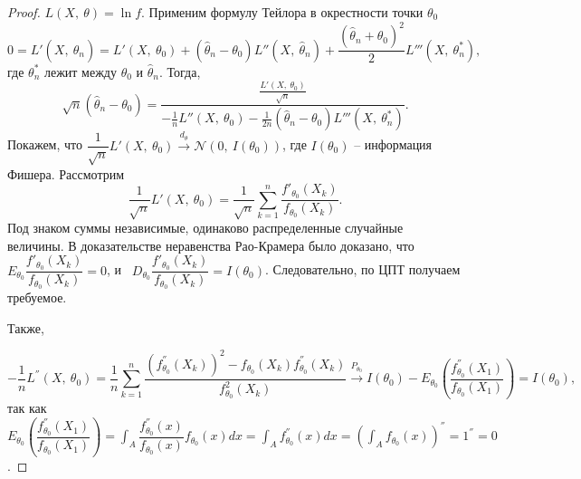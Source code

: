 \begin{proof}
    $\displaystyle L( X,\ \theta ) =\ln f$. Применим формулу Тейлора в окрестности точки $\displaystyle \theta _{0}$
    \begin{equation*}
        0=L'( X,\ \hat{\theta }_{n}) =L'( X,\ \theta _{0}) +(\hat{\theta }_{n} -\theta _{0}) L''( X,\ \hat{\theta }_{n}) +\dfrac{(\hat{\theta }_{n} +\theta _{0})^{2}}{2} L'''\left( X,\ \theta _{n}^{*}\right) ,
    \end{equation*}
    где $\displaystyle \theta _{n}^{*}$ лежит между $\displaystyle \theta _{0}$ и $\displaystyle \hat{\theta }_{n}$. Тогда, 
    \begin{equation*}
        \sqrt{n}(\hat{\theta }_{n} -\theta _{0}) =\dfrac{\frac{L'( X,\ \theta _{0})}{\sqrt{n}}}{-\frac{1}{n} L''( X,\ \theta _{0}) -\frac{1}{2n}(\hat{\theta }_{n} -\theta _{0}) L'''\left( X,\ \theta _{n}^{*}\right)} .
    \end{equation*}
    Покажем, что $\displaystyle \dfrac{1}{\sqrt{n}} L'( X,\ \theta _{0})\xrightarrow{d_{\theta }}\mathcal{N}( 0,\ I( \theta _{0}))$, где $\displaystyle I( \theta _{0})$ -- информация Фишера. Рассмотрим
    \begin{equation*}
        \dfrac{1}{\sqrt{n}} L'( X,\ \theta _{0}) =\dfrac{1}{\sqrt{n}}\sum _{k=1}^{n}\dfrac{f'_{\theta _{0}}( X_{k})}{f_{\theta _{0}}( X_{k})} .
    \end{equation*}
    Под знаком суммы независимые, одинаково распределенные случайные величины. В доказательстве неравенства Рао-Крамера было доказано, что $\displaystyle E_{\theta _{0}}\dfrac{f'_{\theta _{0}}( X_{k})}{f_{\theta _{0}}( X_{k})} =0$, и \ $\displaystyle D_{\theta _{0}}\dfrac{f'_{\theta _{0}}( X_{k})}{f_{\theta _{0}}( X_{k})} =I( \theta _{0})$. Следовательно, по ЦПТ получаем требуемое.
    
    Также,
    
    
    \begin{equation*}
        -\dfrac{1}{n} L^{''}( X,\ \theta _{0}) =\dfrac{1}{n}\sum _{k=1}^{n}\dfrac{\left( f_{\theta _{0}}^{''}( X_{k})\right)^{2} -f_{\theta _{0}}( X_{k}) f_{\theta _{0}}^{''}( X_{k})}{f_{\theta _{0}}^{2}( X_{k})}\xrightarrow{P_{\theta _{0}}} I( \theta _{0}) -E_{\theta _{0}}\left(\dfrac{f_{\theta _{0}}^{''}( X_{1})}{f_{\theta _{0}}( X_{1})}\right) =I( \theta _{0}) ,
    \end{equation*}
    так как $\displaystyle E_{\theta _{0}}\left(\dfrac{f_{\theta _{0}}^{''}( X_{1})}{f_{\theta _{0}}( X_{1})}\right) =\int _{A}\dfrac{f_{\theta _{0}}^{''}( x)}{f_{\theta _{0}}( x)} f_{\theta _{0}}( x) dx=\int _{A} f_{\theta _{0}}^{''}( x) dx=\left(\int _{A} f_{\theta _{0}}( x)\right)^{''} =1^{''} =0$.
    

\end{proof}
